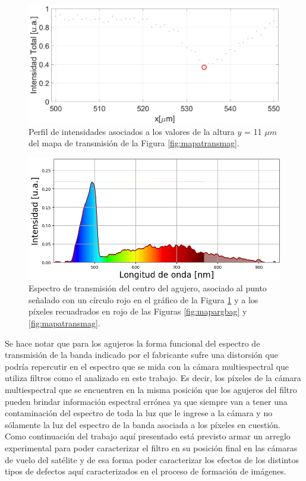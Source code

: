  \begin{figure}[H]
	\centering
	\includegraphics[width=1.0\textwidth]{Figs/microespectrometro/perfilbackag.png}
	\caption{Perfil de intensidades asociados a los valores de la altura $\textit{y}$ = 11 $\mu m$ del mapa de transmisión de la Figura \ref{fig:mapatransmag}.}
	\label{fig:perfilbacka}
\end{figure}

 \begin{figure}[H]
	\centering
	\includegraphics[width=1.0\textwidth]{Figs/microespectrometro/espectroagback.png}
	\caption{Espectro de transmisión del centro del agujero, asociado al punto señalado con un círculo rojo en el gráfico de la Figura \ref{fig:perfilbacka} y a los píxeles recuadrados en rojo de las Figuras \ref{fig:mapargbag} y \ref{fig:mapatransmag}.}
	\label{fig:espectbag}
\end{figure}

Se hace notar que para los agujeros la forma funcional del espectro de transmisión de la banda indicado por el fabricante sufre una distorsión que podría repercutir en el espectro que se mida con la cámara multiespectral que utiliza filtros como el analizado en este trabajo. Es decir, los píxeles de la cámara multiespectral que se encuentren en la misma posición que los agujeros del filtro pueden brindar información espectral errónea ya que siempre van a tener una contaminación del espectro de toda la luz que le ingrese a la cámara y no sólamente la luz del espectro de la banda asociada a los píxeles en cuestión. Como continuación del trabajo aquí presentado está previsto armar un arreglo experimental para poder caracterizar el filtro en su posición final en las cámaras de vuelo del satélite y de esa forma poder caracterizar los efectos de los distintos tipos de defectos aquí caracterizados en el proceso de formación de imágenes.






